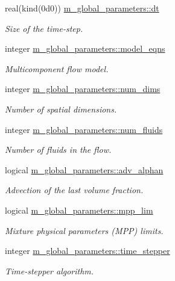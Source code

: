 \begin{DoxyCompactItemize}
real(kind(0d0)) \hyperlink{namespacem__global__parameters_a7fa880b937b54214312469a34268b883}{m\+\_\+global\+\_\+parameters\+::dt}
\begin{DoxyCompactList}\small\item\em Size of the time-\/step. \end{DoxyCompactList}\item 
integer \hyperlink{namespacem__global__parameters_a6cf2e92cfc3b519fb6da6fe9e88fab31}{m\+\_\+global\+\_\+parameters\+::model\+\_\+eqns}
\begin{DoxyCompactList}\small\item\em Multicomponent flow model. \end{DoxyCompactList}\item 
integer \hyperlink{namespacem__global__parameters_a76e251296a28212df87bf9f653ff9a3b}{m\+\_\+global\+\_\+parameters\+::num\+\_\+dims}
\begin{DoxyCompactList}\small\item\em Number of spatial dimensions. \end{DoxyCompactList}\item 
integer \hyperlink{namespacem__global__parameters_a2f0b96a5aef3925aa7e3cc816754e17e}{m\+\_\+global\+\_\+parameters\+::num\+\_\+fluids}
\begin{DoxyCompactList}\small\item\em Number of fluids in the flow. \end{DoxyCompactList}\item 
logical \hyperlink{namespacem__global__parameters_abebd95d9d0271fbda40f47f75a2d829b}{m\+\_\+global\+\_\+parameters\+::adv\+\_\+alphan}
\begin{DoxyCompactList}\small\item\em Advection of the last volume fraction. \end{DoxyCompactList}\item 
logical \hyperlink{namespacem__global__parameters_adc35ba450a192812db36f1d6659d64e6}{m\+\_\+global\+\_\+parameters\+::mpp\+\_\+lim}
\begin{DoxyCompactList}\small\item\em Mixture physical parameters (M\+PP) limits. \end{DoxyCompactList}\item 
integer \hyperlink{namespacem__global__parameters_aeb707079ac4a6d4135c3b7121a8a3232}{m\+\_\+global\+\_\+parameters\+::time\+\_\+stepper}
\begin{DoxyCompactList}\small\item\em Time-\/stepper algorithm. \end{DoxyCompactList}\item 

\end{DoxyCompactItemize}

